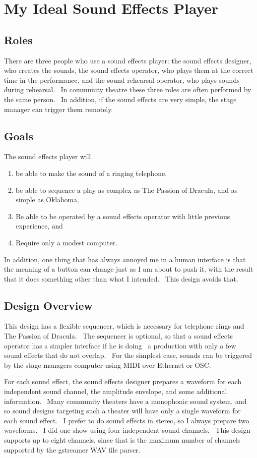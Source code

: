 \documentclass[letterpaper]{article}
\title{}
\author{John Sauter}
\date{2014-12-21T04:50:43.502510496}
\newcommand\liststyleLv{%
\renewcommand\theenumi{\arabic{enumi}}
\renewcommand\theenumii{\arabic{enumii}}
\renewcommand\theenumiii{\arabic{enumiii}}
\renewcommand\theenumiv{\arabic{enumiv}}
\renewcommand\labelenumi{\theenumi.}
\renewcommand\labelenumii{\theenumii.}
\renewcommand\labelenumiii{\theenumiii.}
\renewcommand\labelenumiv{\theenumiv.}
}
\begin{document}
\section{My Ideal Sound Effects Player}
\subsection{Roles}
There are three people who use a sound effects player: the sound effects
designer, who creates the sounds, the sound effects operator, who plays
them at the correct time in the performance, and the sound rehearsal
operator, who plays sounds during rehearsal. \ In community theatre
these three roles are often performed by the same person. \ In
addition, if the sound effects are very simple, the stage manager can
trigger them remotely.

\subsection{Goals}
The sound effects player will

\liststyleLv
\begin{enumerate}
\item be able to make the sound of a ringing telephone,
\item be able to sequence a play as complex as The Passion of Dracula,
and as simple as Oklahoma,
\item Be able to be operated by a sound effects operator with little
previous experience, and
\item Require only a modest computer.
\end{enumerate}
In addition, one thing that has always annoyed me in a human interface
is that the meaning of a button can change just as I am about to push
it, with the result that it does something other than what I intended.
\ This design avoids that.

\subsection{Design Overview}
This design has a flexible sequencer, which is necessary for telephone
rings and The Passion of Dracula. \ The sequencer is optional, so that
a sound effects operator has a simpler interface if he is doing \ a
production with only a few sound effects that do not overlap. \ For the
simplest case, sounds can be triggered by the stage
manager{\textquotesingle}s computer using MIDI over Ethernet or OSC.

For each sound effect, the sound effects designer prepares a waveform
for each independent sound channel, the amplitude envelope, and some
additional information. \ Many community theaters have a monophonic
sound system, and so sound designs targeting such a theater will have
only a single waveform for each sound effect. \ I prefer to do sound
effects in stereo, so I always prepare two waveforms. \ I did one show
using four independent sound channels. \ This design supports up to
eight channels, since that is the maximum number of channels supported
by the gstreamer WAV file parser.
\end{document}
